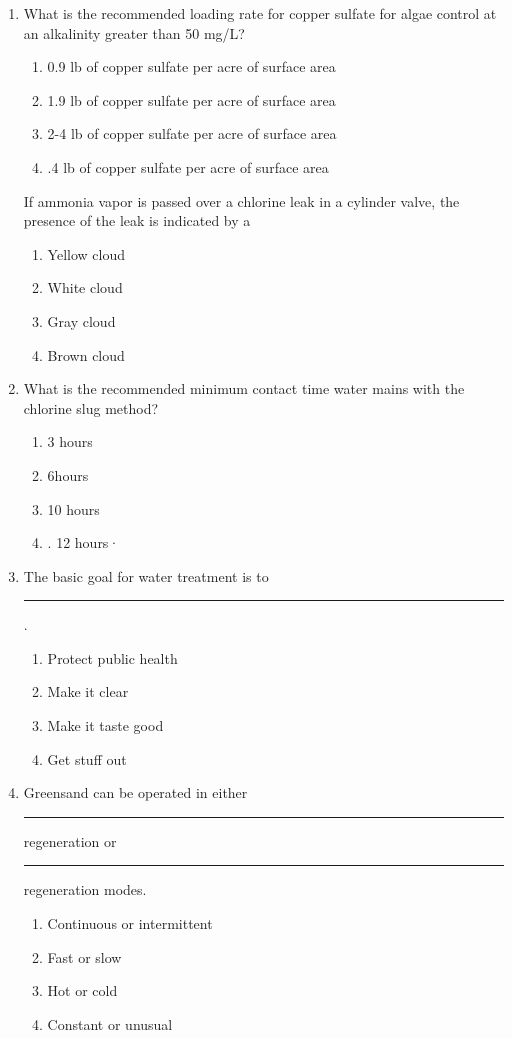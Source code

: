 \documentclass{article}
\begin{document}
\begin{enumerate}
\item What is the recommended loading rate for copper sulfate for algae control at an alkalinity greater than 50 mg/L?
\begin{enumerate}
\item 0.9 lb of copper sulfate per acre of surface area
\item 1.9 lb of copper sulfate per acre of surface area
\item 2-4 lb of copper sulfate per acre of surface area
\item.4 lb of copper sulfate per acre of surface area
\end{enumerate}

If ammonia vapor is passed over a chlorine leak in a cylinder valve, the presence of the leak is indicated by a
\begin{enumerate}
\item Yellow cloud
\item White cloud
\item Gray cloud
\item Brown cloud
\end{enumerate}

\item What is the recommended minimum contact time water mains with the chlorine slug method?
\begin{enumerate}
\item 3 hours
\item 6hours
\item 10 hours
\item. 12 hours·
\end{enumerate}

\item The basic goal for water treatment is to \rule{2cm}{0.3pt}.
\begin{enumerate}
\item Protect public health
\item Make it clear
\item Make it taste good
\item Get stuff out
\end{enumerate}

\item Greensand can be operated in either \rule{2cm}{0.5pt} regeneration or \rule{2cm}{0.5pt} regeneration modes.
\begin{enumerate}
\item Continuous or intermittent
\item Fast or slow
\item Hot or cold
\item Constant or unusual
\end{enumerate}


\end{enumerate}
\end{document}
